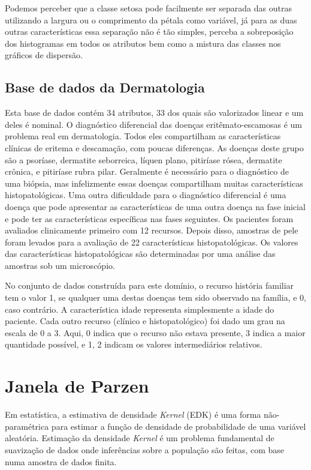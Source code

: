 \documentclass[preprint,12pt]{elsarticle}
\begin{document}
Podemos perceber que a classe setosa pode facilmente ser separada das outras utilizando a largura ou o comprimento da pétala como variável, já para as duas outras características essa separação não é tão simples, perceba a sobreposição dos histogramas em todos os atributos bem como a mistura das classes nos gráficos de dispersão.

\subsection{Base de dados da Dermatologia}

Esta base de dados contém 34 atributos, 33 dos quais são valorizados linear e um deles é nominal. O diagnóstico diferencial das doenças eritêmato-escamosas é um problema real em dermatologia. Todos eles compartilham as características clínicas de eritema e descamação, com poucas diferenças. As doenças deste grupo são a psoríase, dermatite seborreica, líquen plano, pitiríase rósea, dermatite crônica, e pitiríase rubra pilar. Geralmente é necessário para o diagnóstico de uma biópsia, mas infelizmente essas doenças compartilham muitas características histopatológicas. Uma outra dificuldade para o diagnóstico diferencial é uma doença que pode apresentar as características de uma outra doença na fase inicial e pode ter as características específicas nas fases seguintes. Os pacientes foram avaliados clinicamente primeiro com 12 recursos. Depois disso, amostras de pele foram levados para a avaliação de 22 características histopatológicas. Os valores das características histopatológicas são determinadas por uma análise das amostras sob um microscópio.

No conjunto de dados construída para este domínio, o recurso história familiar tem o valor 1, se qualquer uma destas doenças tem sido observado na família, e 0, caso contrário. A característica idade representa simplesmente a idade do paciente. Cada outro recurso (clínico e histopatológico) foi dado um grau na escala de 0 a 3. Aqui, 0 indica que o recurso não estava presente, 3 indica a maior quantidade possível, e 1, 2 indicam os valores intermediários relativos.

\section{Janela de Parzen}

Em estatística, a estimativa de densidade \textit{Kernel} (EDK) é uma forma não-paramétrica para estimar a função de densidade de probabilidade de uma variável aleatória. Estimação da densidade \textit{Kernel} é um problema fundamental de suavização de dados onde inferências sobre a população são feitas, com base numa amostra de dados finita.
\end{document}
